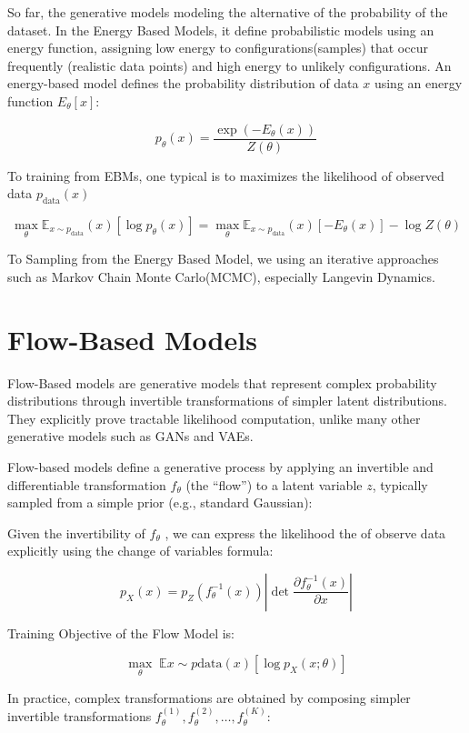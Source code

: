 \documentclass[
  12pt,
]{article}
\theoremstyle{plain}
\theoremstyle{remark}
\begin{document}
So far, the generative models modeling the alternative of the
probability of the dataset. In the Energy Based Models, it define
probabilistic models using an energy function, assigning low energy to
configurations(samples) that occur frequently (realistic data points)
and high energy to unlikely configurations. An energy-based model
defines the probability distribution of data \(x\) using an energy
function \(E_\theta[x]\):

\[
p_\theta(x) = \frac{\exp(-E_\theta(x))}{Z(\theta)}
\]

To training from EBMs, one typical is to maximizes the likelihood of
observed data \(p_{\text{data}}(x)\)

\[
\max_\theta \mathbb{E}_{x \sim p_{\text{data}}}(x)[\log p_\theta(x)] = \max_\theta \mathbb{E}_{x \sim p_{\text{data}}}(x)[-E_\theta(x)] - \log Z(\theta)
\]

To Sampling from the Energy Based Model, we using an iterative
approaches such as Markov Chain Monte Carlo(MCMC), especially Langevin
Dynamics.

\section{Flow-Based Models}\label{flow-based-models}

Flow-Based models are generative models that represent complex
probability distributions through invertible transformations of simpler
latent distributions. They explicitly prove tractable likelihood
computation, unlike many other generative models such as GANs and VAEs.

Flow-based models define a generative process by applying an invertible
and differentiable transformation \(f_{\theta}\) (the ``flow'') to a
latent variable \(z\), typically sampled from a simple prior (e.g.,
standard Gaussian):

Given the invertibility of \(f_\theta\) , we can express the likelihood
the of observe data explicitly using the change of variables formula:

\[
p_{X}(x) = p_{Z}(f_{\theta}^{-1}(x)) \left| \det \frac{\partial f_{\theta}^{-1}(x)}{\partial x} \right|
\]

Training Objective of the Flow Model is:

\[
\max_{\theta}\; \mathbb{E}{x \sim p{\text{data}}(x)}\left[ \log p_{X}(x;\theta) \right]
\]

In practice, complex transformations are obtained by composing simpler
invertible transformations
\(f_{\theta}^{(1)}, f_{\theta}^{(2)}, \dots, f_{\theta}^{(K)}\):
\end{document}

